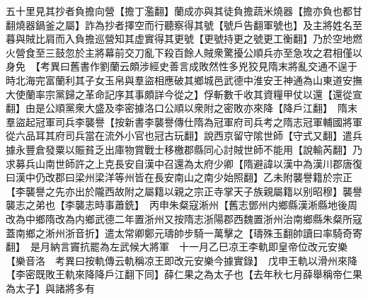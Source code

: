 五十里見其抄者負擔向營【擔丁濫翻】蘭成亦與其徒負擔蔬米燒器【擔亦負也都甘翻燒器鍋釜之屬】詐為抄者擇空而行聽察得其號【號戶告翻軍號也】及主將姓名至暮與賊比肩而入負擔巡營知其虚實得其更號【更號持更之號更工衡翻】乃於空地燃火營食至三鼓忽於主將幕前交刀亂下殺百餘人賊衆驚擾公順兵亦至急攻之君相僅以身免　【考異曰舊書作劉蘭云頗涉經史善言成敗然性多兇狡見隋末將亂交通不逞于時北海完富蘭利其子女玉帛與羣盜相應破其鄉城邑武德中淮安王神通為山東道安撫大使蘭率宗黨歸之革命記序其事頗詳今從之】俘斬數千收其資糧甲仗以還【還從宣翻】由是公順黨衆大盛及李密據洛口公順以衆附之密敗亦來降【降戶江翻】　隋末羣盜起冠軍司兵李襲譽【按新書李襲譽傳仕隋為冠軍府司兵考之隋志冠軍輔國將軍從六品耳其府司兵當在流外小官也冠古玩翻】說西京留守隂世師【守式又翻】遣兵據永豐倉發粟以賑貧乏出庫物賞戰士移檄郡縣同心討賊世師不能用【說輸芮翻】乃求募兵山南世師許之上克長安自漢中召還為太府少卿【隋避諱以漢中為漢川郡唐復曰漢中仍改郡曰梁州梁洋等州皆在長安南山之南少始照翻】乙未附襲譽籍於宗正【李襲譽之先亦出於隴西故附之屬籍以親之宗正寺掌天子族親屬籍以别昭穆】襲譽襲志之弟也【李襲志時事蕭銑】　丙申朱粲寇淅州【舊志鄧州内鄉縣漢淅縣地後周改為中鄉隋改為内鄉武德二年置浙州又按隋志浙陽郡西魏置浙州治南鄉縣朱粲所寇蓋南鄉之淅州浙音折】遣太常卿鄭元璹帥步騎一萬擊之【璹殊玉翻帥讀曰率騎奇寄翻】　是月納言竇抗罷為左武候大將軍　十一月乙巳凉王李軌即皇帝位改元安樂【樂音洛　考異曰按軌傳云軌稱凉王即改元安樂今據實錄】　戊申王軌以滑州來降【李密既敗王軌來降降戶江翻下同】薛仁果之為太子也【去年秋七月薛舉稱帝仁果為太子】與諸將多有

